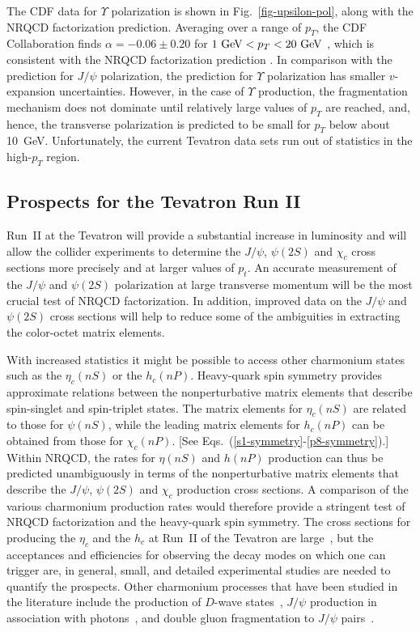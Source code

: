 The CDF data for $\Upsilon$ polarization is shown in 
Fig.~\ref{fig-upsilon-pol}, along with the NRQCD factorization prediction.
Averaging over a range of $p_T$, the CDF
Collaboration finds $\alpha=-0.06\pm 0.20$ for $1\hbox{
GeV}<p_T<20\hbox{ GeV}$ \cite{Cropp:1999ub,Papadimitriou:2001bb}, which
is consistent with the NRQCD factorization prediction
\cite{Braaten:2000gw}.
In comparison with the prediction for $J/\psi$ polarization, the
prediction for $\Upsilon$ polarization has smaller $v$-expansion
uncertainties. However, in the case of $\Upsilon$ production, the
fragmentation mechanism does not dominate until relatively large values
of $p_T$ are reached, and, hence, the transverse
polarization is predicted to be small for $p_T$ below about 10~GeV. 
Unfortunately, the current Tevatron data sets run out of statistics 
in the high-$p_T$ region.

\subsection{Prospects for the Tevatron Run II}

Run~II at the Tevatron will provide a substantial increase in luminosity
and will allow the collider experiments to determine the $J/\psi$,
$\psi(2S)$ and $\chi_c$ cross sections more precisely and at larger
values of $p_t$. An accurate measurement of the $J/\psi$ and $\psi(2S)$
polarization at large transverse momentum will be the most crucial test
of NRQCD factorization. In addition, improved data on the $J/\psi$ and
$\psi(2S)$ cross sections will help to reduce some of the ambiguities in
extracting the color-octet matrix elements.
 
With increased statistics it might be possible to access other
charmonium states such as the $\eta_c(nS)$ or the $h_c(nP)$.  Heavy-quark
spin symmetry provides approximate relations between the
nonperturbative matrix elements that describe spin-singlet and
spin-triplet states. The matrix elements for $\eta_c(nS)$ are related to
those for $\psi(nS)$, while the leading matrix elements for $h_c(nP)$
can be obtained from those for $\chi_c(nP)$. [See
Eqs.~(\ref{s1-symmetry}-\ref{p8-symmetry}).] Within NRQCD, the rates for
$\eta(nS)$ and $h(nP)$ production can thus be predicted unambiguously in
terms of the nonperturbative matrix elements that describe the $J/\psi$,
$\psi(2S)$ and $\chi_c$ production cross sections. A comparison of the
various charmonium production rates would therefore provide a stringent
test of NRQCD factorization and the heavy-quark spin symmetry.  The
cross sections for producing the $\eta_c$ and the $h_c$ at Run~II of the
Tevatron are large~\cite{Mathews:1998nk,Sridhar:1996vd}, but the
acceptances and efficiencies for observing the decay modes on which one
can trigger are, in general, small, and detailed experimental studies
are needed to quantify the prospects.  Other charmonium processes that
have been studied in the literature include the production of $D$-wave
states~\cite{Qiao:1997wb}, $J/\psi$ production in association with
photons~\cite{Kim:1997bb,Mathews:1999ye}, and double gluon fragmentation
to $J/\psi$ pairs~\cite{Barger:1996vx}.
 
